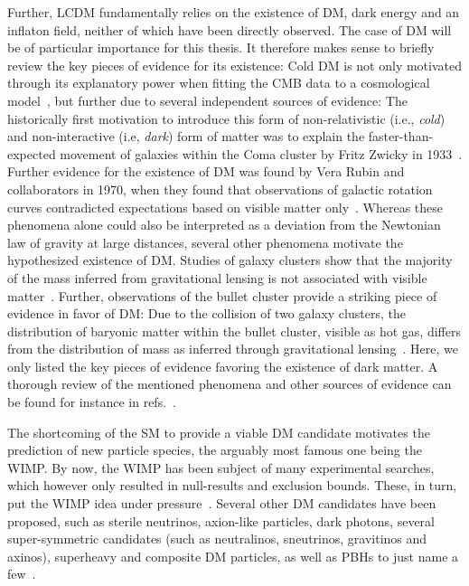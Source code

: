 Further, \ac{LCDM} fundamentally relies on the existence of \ac{DM}, dark energy and an inflaton field, neither of which have been directly observed. The case of \ac{DM} will be of particular importance for this thesis. It therefore makes sense to briefly review the key pieces of evidence for its existence: Cold \ac{DM} is not only motivated through its explanatory power when fitting the \ac{CMB} data to a cosmological model~\cite{Planck:2018vyg}, but further due to several independent sources of evidence: The historically first motivation to introduce this form of non-relativistic (i.e., \textit{cold}) and non-interactive (i.e, \textit{dark}) form of matter was to explain the faster-than-expected movement of galaxies within the Coma cluster by Fritz Zwicky in 1933~\cite{Zwicky:1933gu}. Further evidence for the existence of \ac{DM} was found by Vera Rubin and collaborators in 1970, when they found that observations of galactic rotation  curves contradicted expectations based on visible matter only~\cite{Rubin:1970zza}. Whereas these phenomena alone could also be interpreted as a deviation from the Newtonian law of gravity at large distances, several other phenomena motivate the hypothesized existence of \ac{DM}. Studies of galaxy clusters show that the majority of the mass inferred from gravitational lensing is not associated with visible matter~\cite{vanWaerbeke:2000rm, Bacon:2000sy, Wittman:2000tc, Massey:2010hh}. Further, observations of the bullet cluster provide a striking piece of evidence in favor of \ac{DM}: Due to the collision of two galaxy clusters, the distribution of baryonic matter within the bullet cluster, visible as hot gas, differs from the distribution of mass as inferred through gravitational lensing~\cite{Clowe:2006eq, Harvey:2015hha, Robertson:2016qef}. Here, we only listed the key pieces of evidence favoring the existence of dark matter. A thorough review of the mentioned phenomena and other sources of evidence can be found for instance in refs.~\cite{Profumo:2017hqp, Cirelli:2024ssz}.

The shortcoming of the \ac{SM} to provide a viable \ac{DM} candidate motivates the prediction of new particle species, the arguably most famous one being the \ac{WIMP}. By now, the \ac{WIMP} has been subject of many experimental searches, which however only resulted in null-results and exclusion bounds.  These, in turn, put the \ac{WIMP} idea under pressure~\cite{Arcadi:2024ukq}. Several other \ac{DM} candidates have been proposed, such as sterile neutrinos, axion-like particles, dark photons, several super-symmetric candidates (such as neutralinos, sneutrinos, gravitinos and axinos), superheavy and composite \ac{DM} particles, as well as \acp{PBH} to just name a few~\cite{Profumo:2017hqp, Cirelli:2024ssz}. 

